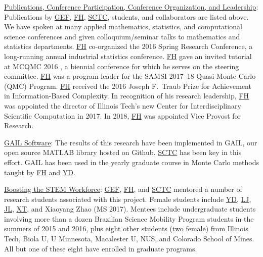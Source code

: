 \documentclass[11pt]{NSFamsart}
\newcommand{\Upara}[1]{\noindent\underline{\upshape #1}:}
\newcommand{\FH}{\hyperlink{FHlink}{FH}\xspace}
\newcommand{\SCTC}{\hyperlink{SCTClink}{SCTC}\xspace}
\newcommand{\GEF}{\hyperlink{GEFlink}{GEF}\xspace}
\newcommand{\YD}{\hyperlink{YDlink}{YD}\xspace}
\newcommand{\LJ}{\hyperlink{LJlink}{LJ}\xspace}
\newcommand{\XT}{\hyperlink{XTlink}{XT}\xspace}
\newcommand{\JL}{\hyperlink{JLlink}{JL}\xspace}
\newcommand{\GAIL}{GAIL\xspace}
\newcommand{\MATLAB}{MATLAB\xspace}
\newcommand{\Rlang}{R\xspace}
\begin{document}
\Upara{Publications, Conference Participation, Conference Organization, and Leadership} Publications by \GEF, \FH,  \SCTC, students, and collaborators are listed above.  We have spoken at many applied mathematics, statistics,
and computational science conferences and given colloquium/seminar talks to mathematics and
statistics departments.  \FH co-organized the
2016 Spring Research
Conference, a long-running annual industrial statistics conference.   \FH gave an invited tutorial
at MCQMC 2016
\cite{Hic17a}, a biennial conference for which he serves on the steering committee.  \FH
was a program leader for the SAMSI 2017--18 Quasi-Monte Carlo (QMC) Program.   \FH received the 2016 Joseph F.\ Traub Prize for Achievement in Information-Based Complexity. In recognition of his research leadership, \FH was appointed the director of Illinois Tech's new Center for Interdisciplinary
Scientific Computation in 2017.  In 2018, \FH was appointed Vice Provost for Research.

\Upara{\GAIL Software} The results of this research have been implemented in
\GAIL, our open source \MATLAB library hosted on
Github.  \SCTC has been key in this effort.  \GAIL has been used in the yearly graduate course in Monte Carlo methods taught by \FH and \YD.

\Upara{Boosting the STEM Workforce} \GEF, \FH, and \SCTC mentored a number of
research students associated with this project.  Female students include \YD, \LJ, \JL, \XT, and Xiaoyang Zhao (MS 2017).   Mentees include undergraduate students involving more than a dozen
Brazilian Science Mobility Program students in the summers of 2015 and 2016, plus eight other students (two female) from Illinois Tech, Biola U, U Minnesota, Macalester U, NUS, and Colorado School of Mines.  All but one of these eight have enrolled in graduate programs. 

\end{document}
